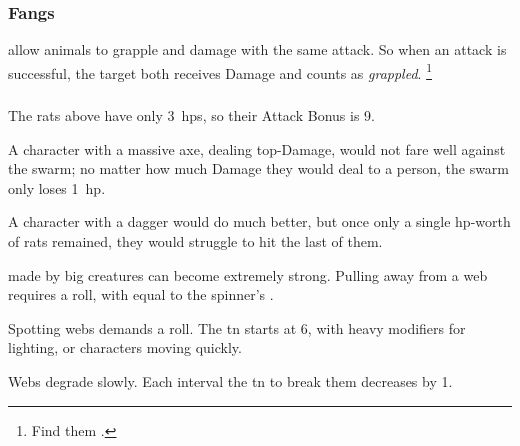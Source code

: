 \begin{multicols}{2}
\subsubsection{Fangs}
\label{teeth}
\label{fangs}
allow animals to grapple and damage with the same attack.
So when an attack is successful, the target both receives Damage and counts as \textit{grappled}.%
\footnote{Find them .}

\subsubsection{}


\begin{exampletext}
  The rats above have only 3~\glspl{hp}, so their Attack Bonus is 9.

  A character with a massive axe, dealing top-Damage, would not fare well against the swarm; no matter how much Damage they would deal to a person, the swarm only loses 1~\gls{hp}.

  A character with a dagger would do much better, but once only a single \gls{hp}-worth of rats remained, they would struggle to hit the last of them.
\end{exampletext}


made by big creatures can become extremely strong.
Pulling away from a web requires a  roll, with  equal to the spinner's .

Spotting webs demands a  roll.
The \gls{tn} starts at 6, with heavy modifiers for lighting, or characters moving quickly.

Webs degrade slowly.
Each \gls{interval} the \gls{tn} to break them decreases by 1.


\end{multicols}
